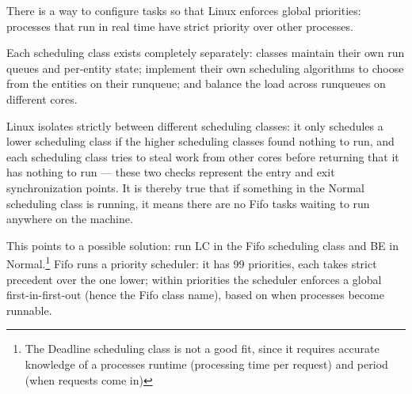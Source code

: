 There is a way to configure tasks so that Linux enforces global priorities:
processes that run in real time have strict priority over other processes.

Each scheduling class exists completely separately: classes maintain their own
run queues and per-entity state; implement their own scheduling algorithms to
choose from the entities on their runqueue; and balance the load across
runqueues on different cores.

Linux isolates strictly between different scheduling classes: it only schedules
a lower scheduling class if the higher scheduling classes found nothing to run,
and each scheduling class tries to steal work from other cores before returning
that it has nothing to run --- these two checks represent the entry and exit
synchronization points. It is thereby true that if something in the Normal
scheduling class is running, it means there are no Fifo tasks waiting to run
anywhere on the machine.

This points to a possible solution: run LC in the Fifo scheduling class and BE
in Normal.\footnote{The Deadline scheduling class is not a good fit, since it
requires accurate knowledge of a processes runtime (processing time per request)
and period (when requests come in)} Fifo runs a priority scheduler: it has 99
priorities, each takes strict precedent over the one lower; within priorities
the scheduler enforces a global first-in-first-out (hence the Fifo class name),
based on when processes become runnable.

